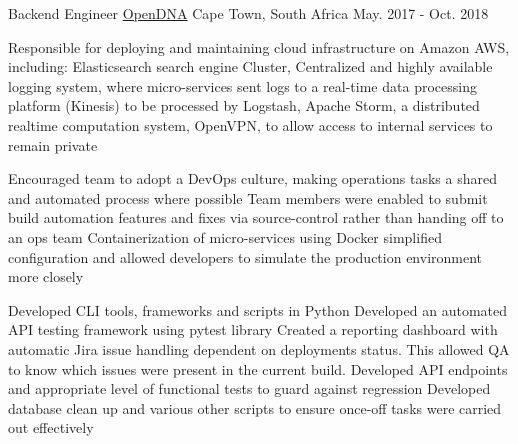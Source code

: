 \begin{cventries}
  \cventry
    {Backend Engineer} %
    {\href{https://opendna.ai}{OpenDNA}} %
    {Cape Town, South Africa} %
    {May. 2017 - Oct. 2018} %
    {
      \begin{cvitems} %
        \item {Responsible for deploying and maintaining cloud infrastructure on Amazon AWS, including: Elasticsearch search engine Cluster, Centralized and highly available logging system, where micro-services sent logs to a real-time data processing platform (Kinesis) to be
processed by Logstash, Apache Storm, a distributed realtime computation system, OpenVPN, to allow access to internal services to remain private}
        \item {Encouraged team to adopt a DevOps culture, making operations tasks a shared and automated process where possible
Team members were enabled to submit build automation features and fixes via source-control rather than handing off to an ops team
Containerization of micro-services using Docker simplified configuration and allowed developers to simulate the production environment
more closely}
        \item {Developed CLI tools, frameworks and scripts in Python
Developed an automated API testing framework using pytest library
Created a reporting dashboard with automatic Jira issue handling dependent on deployments status. This allowed QA to know which issues
were present in the current build.
Developed API endpoints and appropriate level of functional tests to guard against regression
Developed database clean up and various other scripts to ensure once-off tasks were carried out effectively}
      \end{cvitems}
    }


\end{cventries}
